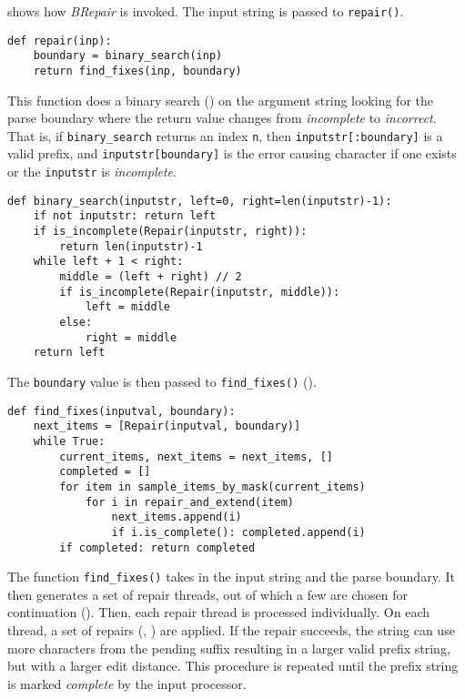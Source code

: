 \documentclass[sigconf,review,anonymous]{acmart}
\def\<#1>{\texttt{#1}}
\newcommand{\brepair}{\textit{BRepair}\xspace}
\begin{document}
 shows how \brepair is invoked. The input string is passed to
\<repair()>.
\begin{lstlisting}[caption=\brepair initial search,label={lst:brepair}]
def repair(inp):
    boundary = binary_search(inp)
    return find_fixes(inp, boundary)
\end{lstlisting}
This function does a binary search () on the
argument string looking for the parse boundary where the return value changes
from \emph{incomplete} to \emph{incorrect}. That is, if \<binary\_search>
returns an index \<n>, then \<inputstr[:boundary]> is a valid prefix, and
\<inputstr[boundary]> is the error causing character if one exists or the
\<inputstr> is \emph{incomplete}.
\begin{lstlisting}[caption=binary search,label={lst:bsearch}]
def binary_search(inputstr, left=0, right=len(inputstr)-1):
    if not inputstr: return left
    if is_incomplete(Repair(inputstr, right)):
        return len(inputstr)-1
    while left + 1 < right:
        middle = (left + right) // 2
        if is_incomplete(Repair(inputstr, middle)):
            left = middle
        else:
            right = middle
    return left
\end{lstlisting}
The \<boundary> value is then passed
to \<find\_fixes()> ().
\begin{lstlisting}[caption=find fixes,label={lst:findfixes}]
def find_fixes(inputval, boundary):
    next_items = [Repair(inputval, boundary)]
    while True:
        current_items, next_items = next_items, []
        completed = []
        for item in sample_items_by_mask(current_items)
            for i in repair_and_extend(item)
                next_items.append(i)
                if i.is_complete(): completed.append(i)
        if completed: return completed
\end{lstlisting}
The function \<find\_fixes()> takes in the input string and the parse boundary.
It then generates a set of repair threads, out of which a few are chosen for
continuation ().
Then, each repair thread is processed individually.
On each thread, a set of repairs (, )
are applied. If the repair succeeds,
the string can use more characters from the pending suffix resulting in a
larger valid prefix string, but with a larger edit distance. This procedure is
repeated until the prefix string is marked \emph{complete} by the input
processor.
\end{document}

